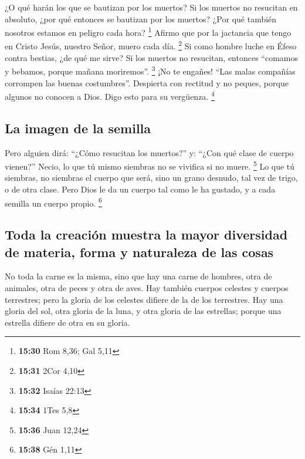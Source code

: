 \begin{paracol}{2}
 ¿O qué harán los que se bautizan por los muertos? Si los
muertos no resucitan en absoluto, ¿por qué entonces se bautizan por los
muertos?  ¿Por qué también nosotros estamos en peligro
cada hora? \footnote{\textbf{15:30} Rom 8,36; Gal 5,11} 
Afirmo que por la jactancia que tengo en Cristo Jesús, nuestro Señor,
muero cada día. \footnote{\textbf{15:31} 2Cor 4,10}  Si
como hombre luche en Éfeso contra bestias, ¿de qué me sirve? Si los
muertos no resucitan, entonces ``comamos y bebamos, porque mañana
moriremos''. \footnote{\textbf{15:32} Isaías 22:13}  ¡No
te engañes! ``Las malas compañías corrompen las buenas costumbres''.
 Despierta con rectitud y no peques, porque algunos no
conocen a Dios. Digo esto para su vergüenza. \footnote{\textbf{15:34}
  1Tes 5,8}

\hypertarget{la-imagen-de-la-semilla}{%
\subsection{La imagen de la semilla}\label{la-imagen-de-la-semilla}}

 Pero alguien dirá: ``¿Cómo resucitan los muertos?'' y:
``¿Con qué clase de cuerpo vienen?''  Necio, lo que tú
mismo siembras no se vivifica si no muere. \footnote{\textbf{15:36} Juan
  12,24}  Lo que tú siembras, no siembras el cuerpo que
será, sino un grano desnudo, tal vez de trigo, o de otra clase.
 Pero Dios le da un cuerpo tal como le ha gustado, y a
cada semilla un cuerpo propio. \footnote{\textbf{15:38} Gén 1,11}

\hypertarget{toda-la-creaciuxf3n-muestra-la-mayor-diversidad-de-materia-forma-y-naturaleza-de-las-cosas}{%
\subsection{Toda la creación muestra la mayor diversidad de materia,
forma y naturaleza de las
cosas}\label{toda-la-creaciuxf3n-muestra-la-mayor-diversidad-de-materia-forma-y-naturaleza-de-las-cosas}}

 No toda la carne es la misma, sino que hay una carne de
hombres, otra de animales, otra de peces y otra de aves. 
Hay también cuerpos celestes y cuerpos terrestres; pero la gloria de los
celestes difiere de la de los terrestres.  Hay una gloria
del sol, otra gloria de la luna, y otra gloria de las estrellas; porque
una estrella difiere de otra en su gloria.


\end{paracol}
